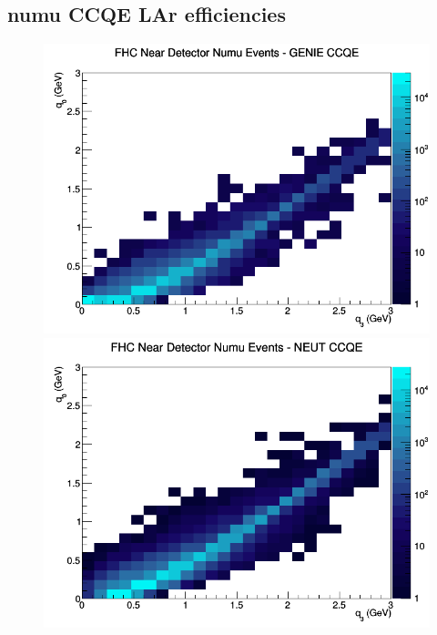 \subsection{numu CCQE LAr efficiencies}
\begin{figure}[h]
\includegraphics[width=\linewidth]{eff_q0_q3/LAr/CCQE_FHC_ND_numu_q3_q0_GENIE.png}
\endminipage
{}
\includegraphics[width=\linewidth]{eff_q0_q3/LAr/CCQE_FHC_ND_numu_q3_q0_NEUT.png}
\endminipage
{}

\end{figure}
